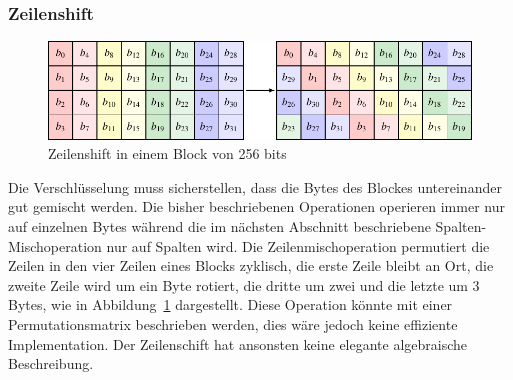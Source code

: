 \subsubsection{Zeilenshift}
\begin{figure}
\centering
\includegraphics[width=\textwidth]{chapters/90-crypto/images/shift.pdf}
\caption{Zeilenshift in einem Block von 256 bits
\label{buch:crypto:fig:shift}}
\end{figure}
Die Verschlüsselung muss sicherstellen, dass die Bytes des Blockes
untereinander gut gemischt werden.
Die bisher beschriebenen Operationen operieren immer nur auf einzelnen
Bytes während
die im nächsten Abschnitt beschriebene Spalten-Mischoperation
nur auf Spalten wird.
Die Zeilenmischoperation permutiert die Zeilen in den vier Zeilen
eines Blocks zyklisch, die erste Zeile bleibt an Ort, die zweite
Zeile wird um ein Byte rotiert, die dritte um zwei und die letzte
um 3 Bytes, wie in Abbildung~\ref{buch:crypto:fig:shift}
dargestellt.
Diese Operation könnte mit einer Permutationsmatrix beschrieben werden,
dies wäre jedoch keine effiziente Implementation.
Der Zeilenschift hat ansonsten keine elegante algebraische Beschreibung.

